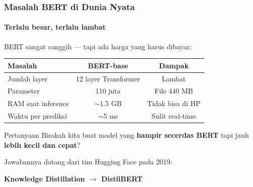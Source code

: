 \documentclass[t,aspectratio=169,xcolor=dvipsnames]{beamer}
\begin{document}
\begin{frame}[shrink=5]
    \frametitle{Masalah BERT di Dunia Nyata}
    \framesubtitle{Terlalu besar, terlalu lambat}
    \small
    BERT sangat canggih --- tapi ada harga yang harus dibayar:

    \vspace{0.2em}
    \begin{center}
    \begin{tabular}{lcc}
        \toprule
        \textbf{Masalah} & \textbf{BERT-base} & \textbf{Dampak} \\
        \midrule
        Jumlah layer        & 12 layer Transformer & Lambat \\
        Parameter           & 110 juta             & File 440 MB \\
        RAM saat inference  & $\sim$1.5 GB         & Tidak bisa di HP \\
        Waktu per prediksi  & $\sim$5 ms           & Sulit real-time \\
        \bottomrule
    \end{tabular}
    \end{center}

    \vspace{0.2em}
    \begin{alertblock}{Pertanyaan}
        Bisakah kita buat model yang \textbf{hampir secerdas BERT} tapi jauh \textbf{lebih kecil dan cepat}?
    \end{alertblock}

    \vspace{0.2em}
    Jawabannya datang dari tim Hugging Face pada 2019:
    \begin{center}
        \large\textcolor{nyupurple}{\textbf{Knowledge Distillation $\to$ DistilBERT}}
    \end{center}
\end{frame}
\end{document}
